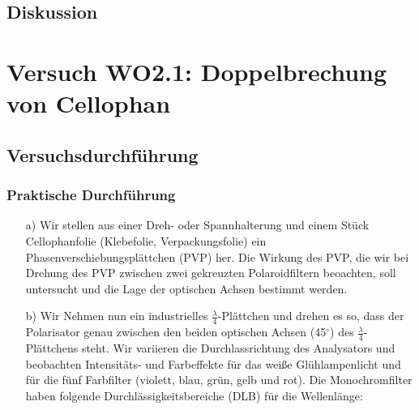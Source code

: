 \documentclass[12pt]{scrartcl}
\begin{document}
\subsection{Diskussion}

\section{Versuch WO2.1:
Doppelbrechung von Cellophan}
\subsection{Versuchsdurchführung}
\subsubsection{Praktische Durchführung}
\begin{enumerate}
\item[a)]
Wir stellen aus einer Dreh- oder Spannhalterung und einem Stück Cellophanfolie (Klebefolie, Verpackungsfolie) ein Phasenverschiebungsplättchen (PVP) her. %
Die Wirkung des PVP, die wir bei Drehung des PVP zwischen zwei gekreuzten Polaroidfiltern beoachten, soll untersucht und die Lage der optischen Achsen bestimmt werden.
\item[b)] Wir Nehmen nun ein industrielles
$\frac{\lambda}{4}$-Plättchen und drehen es so, dass der Polarisator genau zwischen den beiden optischen Achsen (45$^\circ$) des $\frac{\lambda}{4}$-Plättchens steht.
Wir variieren die Durchlassrichtung des Analysators und beobachten Intensitäts- und Farbeffekte für das weiße Glühlampenlicht und für die fünf
Farbfilter (violett, blau, grün, gelb und rot). Die Monochromfilter 
haben folgende Durchlässigkeitsbereiche (DLB) für die Wellenlänge:


\end{enumerate}
\end{document}
